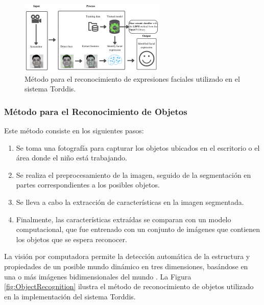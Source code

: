 \documentclass[a4paper,fleqn]{cas-sc}
\begin{document}
	\begin{figure}[hbt!]
		\centering
		\includegraphics[frame,scale=0.5, width=\linewidth]{figs/Figure_2}
		\caption{Método para el reconocimiento de expresiones faciales utilizado en el sistema Torddis.\label{fig:FacialExpression}}
	\end{figure} 
	
	\subsubsection{Método para el Reconocimiento de Objetos}
	Este método consiste en los siguientes pasos:
	\begin{enumerate}
		\item Se toma una fotografía para capturar los objetos ubicados en el escritorio o el área donde el niño está trabajando.
		\item Se realiza el preprocesamiento de la imagen, seguido de la segmentación en partes correspondientes a los posibles objetos.
		\item Se lleva a cabo la extracción de características en la imagen segmentada.
		\item Finalmente, las características extraídas se comparan con un modelo computacional, que fue entrenado con un conjunto de imágenes que contienen los objetos que se espera reconocer.
	\end{enumerate}
	
	La visión por computadora permite la detección automática de la estructura y propiedades de un posible mundo dinámico en tres dimensiones, basándose en una o más imágenes bidimensionales del mundo \citep{Cruz2013}. La Figura \ref{fig:ObjectRecognition} ilustra el método de reconocimiento de objetos utilizado en la implementación del sistema Torddis.
	
\end{document}
